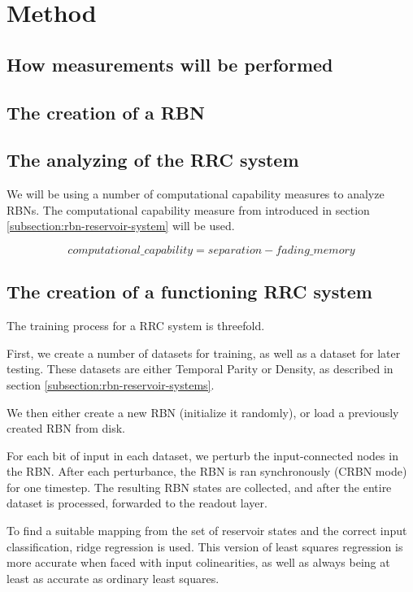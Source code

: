 \section{Method}


\subsection{How measurements will be performed}

\subsection{The creation of a RBN}

\subsection{The analyzing of the RRC system}

We will be using a number of computational capability measures to analyze RBNs.
The computational capability measure from \cite{rbn-reservoir} introduced in section \ref{subsection:rbn-reservoir-system} will be used.

$$ computational\_capability = separation - fading\_memory $$

\subsection{The creation of a functioning RRC system}

The training process for a RRC system is threefold.

First, we create a number of datasets for training,
as well as a dataset for later testing.
These datasets are either Temporal Parity or Density,
as described in section \ref{subsection:rbn-reservoir-systems}.

We then either create a new RBN (initialize it randomly),
or load a previously created RBN from disk.

For each bit of input in each dataset,
we perturb the input-connected nodes in the RBN.
After each perturbance, the RBN is ran synchronously (CRBN mode) for one timestep.
The resulting RBN states are collected,
and after the entire dataset is processed,
forwarded to the readout layer.

To find a suitable mapping from the set of reservoir states and the correct input classification,
ridge regression \cite{hoerl1970ridge} is used.
This version of least squares regression is more accurate when faced with input colinearities,
as well as always being at least as accurate as ordinary least squares.

